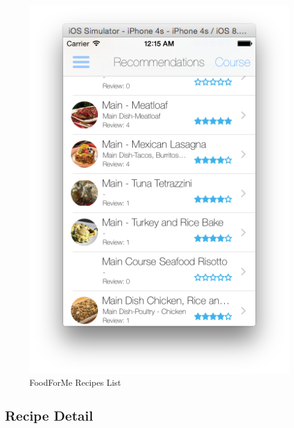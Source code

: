  \begin{figure}[h]
 	\centering
	\includegraphics[width=.5\linewidth]{figures/ch4_app_screen_shots/recipes/recipes.png}
    \caption{FoodForMe Recipes List}
	\label{fig:foodforme_recipe_screen}
	\end{figure}
	  
\subsection{Recipe Detail} 

